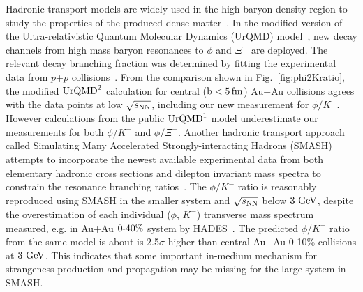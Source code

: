 \documentclass[%
 reprint,	
showpacs,
 amsmath,amssymb,
 aps,
 superscriptaddress,
]{revtex4-1}
\begin{document}
Hadronic transport models are widely used in the high baryon density region to study the properties of the produced dense matter~\cite{urQMD,UrQMD_2,Steinheimer_2015_UrQMD,Elfner_SMASH,Hartnack:2011cn,Song:2020clw}. In the modified version of the Ultra-relativistic Quantum Molecular Dynamics (UrQMD) model~\cite{Steinheimer_2015_UrQMD}, new decay channels from high mass baryon resonances to $\phi$ and $\Xi^-$ are deployed. The relevant decay branching fraction was determined by fitting the experimental data from $p$+$p$ collisions~\cite{ANKE_phi}. From the comparison shown in Fig.~\ref{fig:phi2Kratio}, the modified $\textup{UrQMD}^{2}$ calculation for central ($\rm{b}<5\,\rm{fm}$) Au+Au collisions agrees with the data points at low ${\sqrt{s_{\rm NN}}}$, including our new measurement for $\phi/K^-$.
However calculations from the public $\textup{UrQMD}^{1}$ model underestimate our measurements for both $\phi/K^-$ and $\phi/\Xi^-$.   
Another hadronic transport approach called Simulating Many Accelerated Strongly-interacting Hadrons (SMASH) attempts to incorporate the newest available experimental data from both elementary hadronic cross sections and dilepton invariant mass spectra to constrain the resonance branching ratios~\cite{Elfner_SMASH}. The $\phi/K^-$ ratio is reasonably reproduced using SMASH in the smaller system and ${\sqrt{s_{\rm NN}}}$ below $\textup{3 GeV}$, despite the overestimation of each individual ($\phi$, $K^-$) transverse mass spectrum measured, e.g. in Au+Au $\textup{0-40\%}$ system by HADES~\cite{Elfner_SMASH,HADES_phi_AuAu}. The predicted $\phi/K^-$ ratio from the same model is about is 2.5$\sigma$ higher than central Au+Au 0-10\% collisions at $\textup{3 GeV}$. This indicates that some important in-medium mechanism for strangeness production and propagation may be missing for the large system in SMASH.
\end{document}

